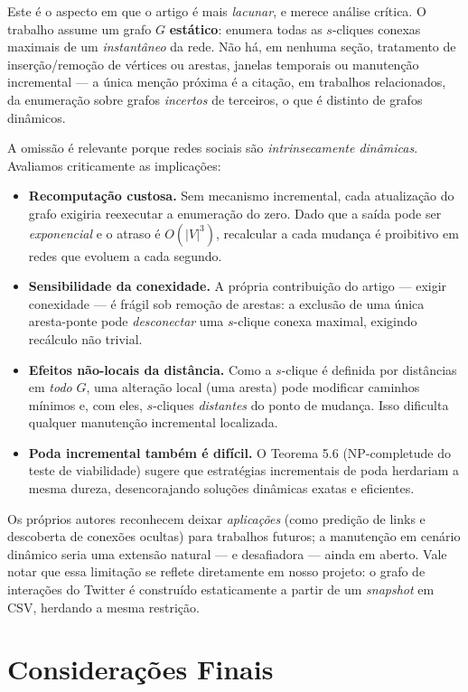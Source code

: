 \documentclass[12pt]{article}
\begin{document}
Este é o aspecto em que o artigo é mais \emph{lacunar}, e merece análise crítica.
O trabalho assume um grafo $G$ \textbf{estático}: enumera todas as $s$-cliques
conexas maximais de um \emph{instantâneo} da rede. Não há, em nenhuma seção,
tratamento de inserção/remoção de vértices ou arestas, janelas temporais ou
manutenção incremental --- a única menção próxima é a citação, em trabalhos
relacionados, da enumeração sobre grafos \emph{incertos} de terceiros, o que é
distinto de grafos dinâmicos.

A omissão é relevante porque redes sociais são \emph{intrinsecamente dinâmicas}.
Avaliamos criticamente as implicações:

\begin{itemize}
  \item \textbf{Recomputação custosa.} Sem mecanismo incremental, cada
  atualização do grafo exigiria reexecutar a enumeração do zero. Dado que a
  saída pode ser \emph{exponencial} e o atraso é $O(|V|^3)$, recalcular a cada
  mudança é proibitivo em redes que evoluem a cada segundo.
  \item \textbf{Sensibilidade da conexidade.} A própria contribuição do artigo
  --- exigir conexidade --- é frágil sob remoção de arestas: a exclusão de uma
  única aresta-ponte pode \emph{desconectar} uma $s$-clique conexa maximal,
  exigindo recálculo não trivial.
  \item \textbf{Efeitos não-locais da distância.} Como a $s$-clique é definida
  por distâncias em \emph{todo} $G$, uma alteração local (uma aresta) pode
  modificar caminhos mínimos e, com eles, $s$-cliques \emph{distantes} do ponto
  de mudança. Isso dificulta qualquer manutenção incremental localizada.
  \item \textbf{Poda incremental também é difícil.} O Teorema 5.6 (NP-completude
  do teste de viabilidade) sugere que estratégias incrementais de poda herdariam
  a mesma dureza, desencorajando soluções dinâmicas exatas e eficientes.
\end{itemize}

Os próprios autores reconhecem deixar \emph{aplicações} (como predição de links e
descoberta de conexões ocultas) para trabalhos futuros; a manutenção em cenário
dinâmico seria uma extensão natural --- e desafiadora --- ainda em aberto. Vale
notar que essa limitação se reflete diretamente em nosso projeto: o grafo de
interações do Twitter é construído estaticamente a partir de um \emph{snapshot}
em CSV, herdando a mesma restrição.

\section{Considerações Finais}
\end{document}
